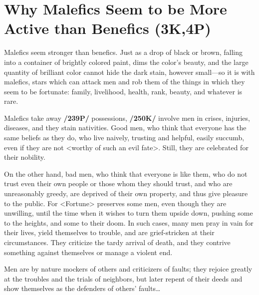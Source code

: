 \section{Why Malefics Seem to be More Active than Benefics (3K,4P)}

 
Malefics seem stronger than benefics. Just as a drop of black or brown, falling into a container of brightly colored paint, dims the color’s beauty, and the large quantity of brilliant color cannot hide the dark stain, however small—so it is with malefics, stars which can attack men and rob them of the things in which they seem to be fortunate: family, livelihood, health, rank, beauty, and whatever is rare. 

Malefics  take away \textbf{/239P/} possessions, \textbf{/250K/} involve men in crises, injuries, diseases, and they stain nativities. Good men, who think that everyone has the same beliefs as they do, who live naively, trusting and helpful, easily succumb, even if they are not <worthy of such an evil fate>. Still, they are celebrated for their
nobility. 

On the other hand, bad men, who think that everyone is like them, who do not trust even their own people or those whom they should trust, and who are unreasonably greedy, are deprived of their own property, and thus give pleasure to the public. For <Fortune> preserves some men, even though they are unwilling, until the time when it wishes to turn them upside down, pushing some to the heights, and some to their doom. In such cases, many men pray in vain for their lives, yield themselves to trouble, and are grief-stricken at their circumstances. They criticize the tardy arrival of death, and they contrive something against themselves or manage a violent end. 


Men are by nature mockers of others and criticizers of faults; they rejoice greatly at the troubles and the trials of neighbors, but later repent of their deeds and show themselves as the defenders of others’ faults…


